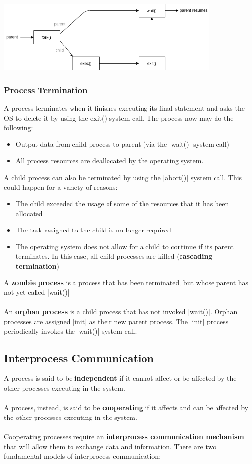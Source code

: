 \documentclass{article}
\begin{document}
\centerline{\includegraphics[width=11cm]{./assets/process creation.png}}
\vspace{.5cm}

\subsubsection{Process Termination}
A process terminates when it finishes executing its final statement and asks the OS to delete it by using the exit() system call. The process now may do the following:

\begin{itemize}
	\item Output data from child process to parent (via the \cverb|wait()| system call)
	\item All process resources are deallocated by the operating system.
\end{itemize}
A child process can also be terminated by using the \cverb|abort()| system call. This could happen for a variety of reasons:

\begin{itemize}
	\item The child exceeded the usage of some of the resources that it has been allocated
	\item The task assigned to the child is no longer required
	\item The operating system does not allow for a child to continue if its parent terminates. In this case, all child processes are killed (\textbf{cascading termination})
\end{itemize}
A \textbf{zombie process} is a process that has been terminated, but whose parent has not yet called \cverb|wait()| \\ \\
An \textbf{orphan process} is a child process that has not invoked \cverb|wait()|. Orphan processes are assigned \cverb|init| as their new parent process. The \cverb|init| process periodically invokes the \cverb|wait()| system call.

\subsection{Interprocess Communication}
A process is said to be \textbf{independent} if it cannot affect or be affected by the other processes executing in the system. \\ \\
A process, instead, is said to be \textbf{cooperating} if it affects and can be affected by the other processes executing in the system. \\ \\
Cooperating processes require an \textbf{interprocess communication mechanism} that will allow them to exchange data and information. There are two fundamental models of interprocess communication:
\end{document}
